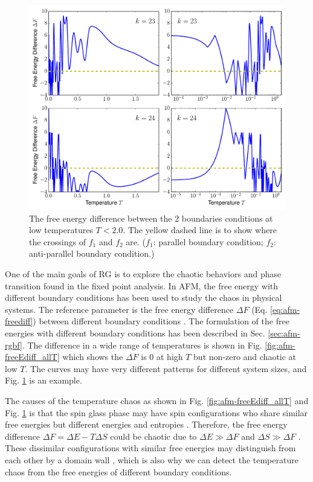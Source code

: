 \begin{figure}[h]
\centering \includegraphics[width=0.8\columnwidth]{Chapter-3/freeEdifference_k23_24.pdf}
\protect\caption{The free energy difference between the 2 boundaries conditions at low temperatures $T<2.0$. The yellow dashed line is to show where the crossings of $f_1$ and $f_2$ are. ($f_1$: parallel boundary condition; $f_2$: anti-parallel boundary condition.) }
\label{fig:afm-freeEdiff} 
\end{figure}

One of the main goals of RG is to explore the chaotic behaviors and phase transition found in the fixed point analysis.  In AFM, the free energy with different boundary conditions has been used to study the chaos in physical systems. The reference parameter is the free energy difference $\Delta F$ (Eq. \ref{eq:afm-freediff}) between different boundary conditions  \cite{wang2015chaos}. The formulation of the free energies with different boundary conditions has been described in Sec. \ref{sec:afm-rgbf}. The difference in a wide range of temperatures is shown in Fig. \ref{fig:afm-freeEdiff_allT} which shows the $\Delta F$ is 0 at high $T$ but non-zero and chaotic at low $T$. The curves may have very different patterns for different system sizes, and Fig. \ref{fig:afm-freeEdiff}  is an example.

The causes of the temperature chaos as shown in Fig. \ref{fig:afm-freeEdiff_allT} and Fig. \ref{fig:afm-freeEdiff} is that the spin glass phase may have spin configurations who share similar free energies but different energies and entropies \cite{fisher86prl, bray1987chaotic}. Therefore, the free energy difference $\Delta F = \Delta E -T\Delta S $ could be chaotic due to $\Delta E \gg \Delta F$ and  $\Delta S \gg \Delta F$ \cite{wang2015chaos}. These dissimilar configurations with similar free energies may distinguish from each other by a domain wall \cite{wang2015chaos}, which is also why we can detect the temperature chaos from the free energies of different boundary conditions. 


